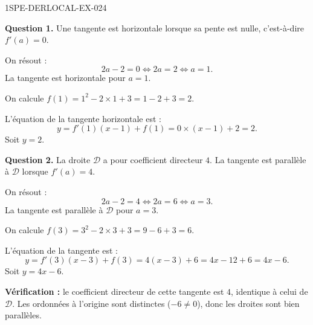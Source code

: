 \begin{corrige}{1SPE-DERLOCAL-EX-024}

\textbf{Question 1.} Une tangente est horizontale lorsque sa pente est nulle, c'est-à-dire $f'(a) = 0$.

On résout :
\[
2a - 2 = 0 \iff 2a = 2 \iff a = 1.
\]
La tangente est horizontale pour $\boxed{a = 1}$.

On calcule $f(1) = 1^2 - 2 \times 1 + 3 = 1 - 2 + 3 = 2$.

L'équation de la tangente horizontale est :
\[
y = f'(1)(x - 1) + f(1) = 0 \times (x - 1) + 2 = 2.
\]
Soit $\boxed{y = 2}$.

\textbf{Question 2.} La droite $\mathcal{D}$ a pour coefficient directeur $4$. La tangente est parallèle à $\mathcal{D}$ lorsque $f'(a) = 4$.

On résout :
\[
2a - 2 = 4 \iff 2a = 6 \iff a = 3.
\]
La tangente est parallèle à $\mathcal{D}$ pour $\boxed{a = 3}$.

On calcule $f(3) = 3^2 - 2 \times 3 + 3 = 9 - 6 + 3 = 6$.

L'équation de la tangente est :
\[
y = f'(3)(x - 3) + f(3) = 4(x - 3) + 6 = 4x - 12 + 6 = 4x - 6.
\]
Soit $\boxed{y = 4x - 6}$.

\textbf{Vérification :} le coefficient directeur de cette tangente est $4$, identique à celui de $\mathcal{D}$. Les ordonnées à l'origine sont distinctes ($-6
\neq 0$), donc les droites sont bien parallèles. \checkmark

\end{corrige}
